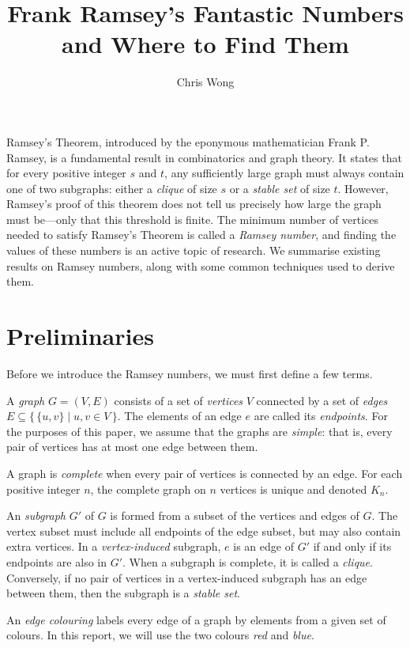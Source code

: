 \documentclass{article}
\begin{document}
\author{Chris Wong}
\title{Frank Ramsey's Fantastic Numbers and Where to Find Them}
\maketitle

Ramsey's Theorem, introduced by the eponymous mathematician Frank P. Ramsey, is a fundamental result in combinatorics and graph theory. It states that for every positive integer $s$ and $t$, any sufficiently large graph must always contain one of two subgraphs: either a \textit{clique} of size $s$ or a \textit{stable set} of size $t$. However, Ramsey's proof of this theorem does not tell us precisely how large the graph must be---only that this threshold is finite. The minimum number of vertices needed to satisfy Ramsey's Theorem is called a \textit{Ramsey number}, and finding the values of these numbers is an active topic of research. We summarise existing results on Ramsey numbers, along with some common techniques used to derive them.

\section{Preliminaries}

Before we introduce the Ramsey numbers, we must first define a few terms.

A \textit{graph} $G = (V, E)$ consists of a set of \textit{vertices} $V$ connected by a set of \textit{edges} $E \subseteq \{\, \{u, v\} \mid u, v \in V \,\}$. The elements of an edge $e$ are called its \textit{endpoints}. For the purposes of this paper, we assume that the graphs are \textit{simple}: that is, every pair of vertices has at most one edge between them.

A graph is \textit{complete} when every pair of vertices is connected by an edge. For each positive integer $n$, the complete graph on $n$ vertices is unique and denoted $K_n$.

An \textit{subgraph} $G'$ of $G$ is formed from a subset of the vertices and edges of $G$. The vertex subset must include all endpoints of the edge subset, but may also contain extra vertices. In a \textit{vertex-induced} subgraph, $e$ is an edge of $G'$ if and only if its endpoints are also in $G'$. When a subgraph is complete, it is called a \textit{clique}. Conversely, if no pair of vertices in a vertex-induced subgraph has an edge between them, then the subgraph is a \textit{stable set}.

An \textit{edge colouring} labels every edge of a graph by elements from a given set of colours. In this report, we will use the two colours \textit{red} and \textit{blue}.
\end{document}
